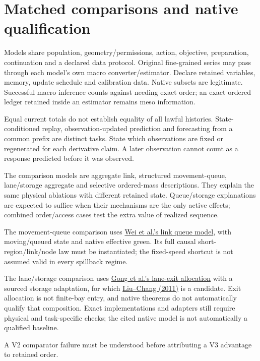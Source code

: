 \documentclass[10pt,a4paper]{article}
\begin{document}
\section{Matched comparisons and native qualification}

Models share population, geometry/permissions, action, objective,
preparation, continuation and a declared data protocol.
Original fine-grained series may pass through each model's own macro
converter/estimator. Declare retained variables, memory, update schedule
and calibration data. Native subsets are legitimate. Successful macro
inference counts against needing exact order; an exact ordered ledger
retained inside an estimator remains meso information.

Equal current totals do not establish equality of all lawful histories.
State-conditioned replay, observation-updated prediction and forecasting
from a common prefix are distinct tasks. State which observations are
fixed or regenerated for each derivative claim. A later observation
cannot count as a response predicted before it was observed.


The comparison models are aggregate link, structured movement-queue,
lane/storage aggregate and selective ordered-mass descriptions. They
explain the same physical ablations with different retained state.
Queue/storage explanations are expected to suffice when their mechanisms
are the only active effects; combined order/access cases test the extra
value of realized sequence.
\par

The movement-queue comparison uses
\href{https://arxiv.org/html/2310.12249v2}{Wei et al.'s link queue model},
with moving/queued state and native effective green. Its full causal
short-region/link/node law must be instantiated; the fixed-speed shortcut
is not assumed valid in every spillback regime.

The lane/storage comparison uses
\href{https://www.sciencedirect.com/science/article/pii/S0191261525000578}
{Gong et al.'s lane-exit allocation} with a sourced storage adaptation,
for which \href{https://attap.umd.edu/wp-content/uploads/2022/05/TRC522.pdf}
{Liu--Chang (2011)} is a candidate. Exit allocation is not finite-bay
entry, and native theorems do not automatically qualify that composition.
Exact implementations and adapters still require physical and task-specific
checks; the cited native model is not automatically a qualified baseline.

A V2 comparator failure must be understood before attributing a V3
advantage to retained order.
\end{document}
